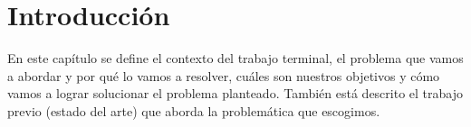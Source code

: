 \chapter{Introducci\'on}

En este capítulo se define el contexto del trabajo terminal, el problema que vamos a abordar y por qué lo vamos a resolver, cuáles son nuestros objetivos y cómo vamos a lograr solucionar el problema planteado. También está descrito el trabajo previo (estado del arte) que aborda la problemática que escogimos.